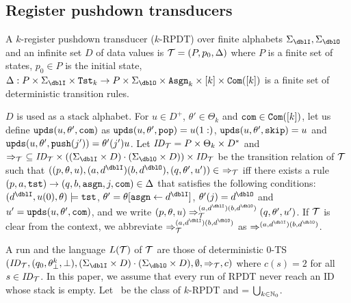 \subsection{Register pushdown transducers}
\begin{definition}
A $k$-{register pushdown transducer} ($k$-RPDT) over finite alphabets $\Sigma_\dblI,\Sigma_\dblO$ and an infinite set $D$ of data values is
${\cal T}=(P, p_0, \Delta)$ where
$P$ is a finite set of states,
$p_0\in P$ is the initial state,
$\Delta: P\times\Sigma_\dblI\times\Tst_k \to P\times\Sigma_\dblO\times \Asgn_k \times [k]\times \Com([k])$ is a finite set of deterministic transition rules.
\end{definition}
$D$ is used as a stack alphabet.
For $u\in D^+$, $\theta'\in\Theta_k$ and $\mathtt{com}\in\mathtt{Com}([k])$, let us define $\mathtt{upds}(u,\theta',\mathtt{com})$ as $\mathtt{upds}(u,\theta',\mathtt{pop})=u(1:)$, $\mathtt{upds}(u,\theta',\mathtt{skip})=u$ and $\mathtt{upds}(u,\theta',\mathtt{push}(j'))=\theta'(j')u$.
Let $\mathit{ID}_{\cal T}= P\times \Theta_k\times D^*$
and $\Rightarrow_\calT\ \subseteq \ID_\calT\times ((\Sigma_\dblI\times D)\cdot(\Sigma_\dblO\times D))\times \ID_\calT$ be the transition relation of ${\cal T}$ such that $((p, \theta, u), (a,d^\dblI)(b,d^\dblO), (q, \theta', u'))\in\ \Rightarrow_\calT$ iff
there exists a rule $(p, a, \mathtt{tst}) \to (q, b, \mathtt{asgn}, j, \mathtt{com}) \in \Delta$
that satisfies the following conditions:
$(d^\dblI, u(0), \theta)\models\tst$, $\theta' = \theta[\asgn\leftarrow d^\dblI]$, $\theta'(j) = d^\dblO$ and
$u'=\mathtt{upds}(u,\theta',\mathtt{com})$,
and we write $(p, \theta, u) \done_{\calT}^{(a,d^\dblI)(b,d^\dblO)}(q, \theta', u')$.
If ${\cal T}$ is clear from the context,
we abbreviate
$\done_{\calT}^{(a,d^\dblI)(b,d^\dblO)}$ as $\done^{(a,d^\dblI)(b,d^\dblO)}$.

A run and the language $L({\cal T})$ of ${\cal T}$ are those of deterministic $0$-TS $(\ID_\calT, (q_0,\theta^k_\bot, \bot), (\Sigma_\dblI\times D)\cdot(\Sigma_\dblO\times D), \emptyset, \Rightarrow_\calT, c)$ where $c(s)=2$ for all $s\in\mathit{ID}_{\cal T}$.
In this paper,
we assume that every run of RPDT never reach an ID whose stack is empty.
Let \RPDTk\ be the class of $k$-RPDT and \RPDT = $\bigcup_{k\in\mathbb{N}_0}$\RPDTk.

